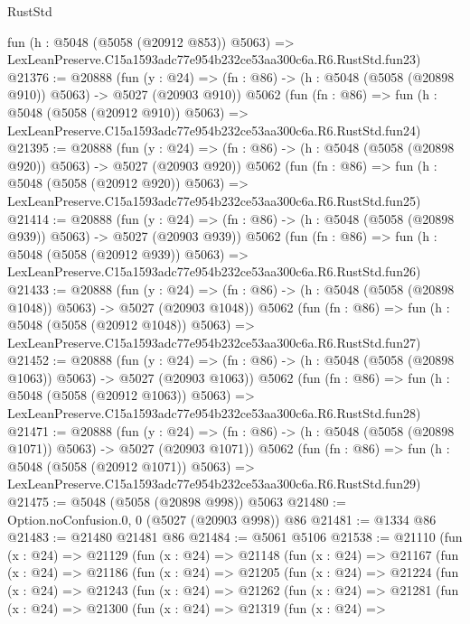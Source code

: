 \begin{lexlean}{RustStd}
\begin{coremodule}
    fun (h : @5048 (@5058 (@20912 @853)) @5063) =>
    LexLeanPreserve.C15a1593adc77e954b232ce53aa300c6a.R6.RustStd.fun23)
@21376 := @20888
    (fun (y : @24) => (fn : @86) -> (h : @5048 (@5058 (@20898 @910)) @5063) -> @5027 (@20903 @910))
    @5062
    (fun (fn : @86) =>
    fun (h : @5048 (@5058 (@20912 @910)) @5063) =>
    LexLeanPreserve.C15a1593adc77e954b232ce53aa300c6a.R6.RustStd.fun24)
@21395 := @20888
    (fun (y : @24) => (fn : @86) -> (h : @5048 (@5058 (@20898 @920)) @5063) -> @5027 (@20903 @920))
    @5062
    (fun (fn : @86) =>
    fun (h : @5048 (@5058 (@20912 @920)) @5063) =>
    LexLeanPreserve.C15a1593adc77e954b232ce53aa300c6a.R6.RustStd.fun25)
@21414 := @20888
    (fun (y : @24) => (fn : @86) -> (h : @5048 (@5058 (@20898 @939)) @5063) -> @5027 (@20903 @939))
    @5062
    (fun (fn : @86) =>
    fun (h : @5048 (@5058 (@20912 @939)) @5063) =>
    LexLeanPreserve.C15a1593adc77e954b232ce53aa300c6a.R6.RustStd.fun26)
@21433 := @20888
    (fun (y : @24) =>
    (fn : @86) -> (h : @5048 (@5058 (@20898 @1048)) @5063) -> @5027 (@20903 @1048))
    @5062
    (fun (fn : @86) =>
    fun (h : @5048 (@5058 (@20912 @1048)) @5063) =>
    LexLeanPreserve.C15a1593adc77e954b232ce53aa300c6a.R6.RustStd.fun27)
@21452 := @20888
    (fun (y : @24) =>
    (fn : @86) -> (h : @5048 (@5058 (@20898 @1063)) @5063) -> @5027 (@20903 @1063))
    @5062
    (fun (fn : @86) =>
    fun (h : @5048 (@5058 (@20912 @1063)) @5063) =>
    LexLeanPreserve.C15a1593adc77e954b232ce53aa300c6a.R6.RustStd.fun28)
@21471 := @20888
    (fun (y : @24) =>
    (fn : @86) -> (h : @5048 (@5058 (@20898 @1071)) @5063) -> @5027 (@20903 @1071))
    @5062
    (fun (fn : @86) =>
    fun (h : @5048 (@5058 (@20912 @1071)) @5063) =>
    LexLeanPreserve.C15a1593adc77e954b232ce53aa300c6a.R6.RustStd.fun29)
@21475 := @5048 (@5058 (@20898 @998)) @5063
@21480 := Option.noConfusion.{0, 0} (@5027 (@20903 @998)) @86
@21481 := @1334 @86
@21483 := @21480 @21481 @86
@21484 := @5061 @5106
@21538 := @21110
    (fun (x : @24) =>
    @21129
      (fun (x : @24) =>
      @21148
        (fun (x : @24) =>
        @21167
          (fun (x : @24) =>
          @21186
            (fun (x : @24) =>
            @21205
              (fun (x : @24) =>
              @21224
                (fun (x : @24) =>
                @21243
                  (fun (x : @24) =>
                  @21262
                    (fun (x : @24) =>
                    @21281
                      (fun (x : @24) =>
                      @21300
                        (fun (x : @24) =>
                        @21319
                          (fun (x : @24) =>

\end{coremodule}
\end{lexlean}
